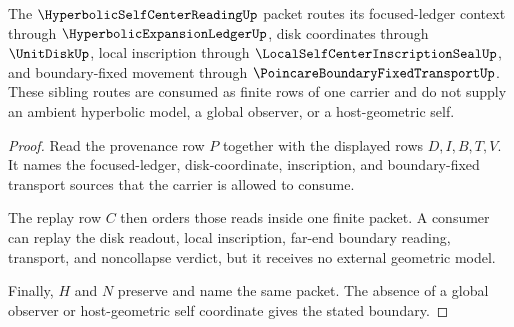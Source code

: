 \begin{theorem}
\label{thm:hyperbolic-self-center-reading-provenance-route}
The $\HyperbolicSelfCenterReadingUp$ packet routes its focused-ledger context through $\HyperbolicExpansionLedgerUp$, disk coordinates through $\UnitDiskUp$, local inscription through $\LocalSelfCenterInscriptionSealUp$, and boundary-fixed movement through $\PoincareBoundaryFixedTransportUp$. These sibling routes are consumed as finite rows of one carrier and do not supply an ambient hyperbolic model, a global observer, or a host-geometric self.
\end{theorem}
\begin{proof}
Read the provenance row $P$ together with the displayed rows $D,I,B,T,V$. It names the focused-ledger, disk-coordinate, inscription, and boundary-fixed transport sources that the carrier is allowed to consume.

The replay row $C$ then orders those reads inside one finite packet. A consumer can replay the disk readout, local inscription, far-end boundary reading, transport, and noncollapse verdict, but it receives no external geometric model.

Finally, $H$ and $N$ preserve and name the same packet. The absence of a global observer or host-geometric self coordinate gives the stated boundary.
\end{proof}


\begin{closurestatus}{\HyperbolicSelfCenterReadingUp}
  \theoryclosure{\seedClosure}
  \formalstatus{\unformalizedV}
\end{closurestatus}
